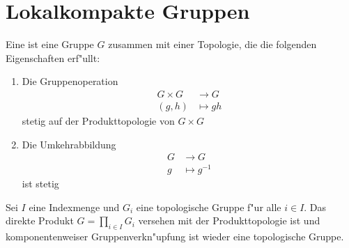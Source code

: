 \section{Lokalkompakte Gruppen}

\begin{defi}
	Eine  ist eine Gruppe $G$ zusammen mit einer Topologie, die die folgenden Eigenschaften erf"ullt:
		\begin{enumerate}[label=(\roman*), leftmargin=*, align=left, labelsep=1pt]
			\item Die Gruppenoperation
				\begin{align*}
					G \times G &\to G\\
					(g,h) &\mapsto gh
				\end{align*}
			stetig auf der Produkttopologie von $G \times G$
			\item Die Umkehrabbildung
				\begin{align*}
					G &\to G\\
					g &\mapsto g^{-1}
				\end{align*}
				ist stetig
		\end{enumerate}
	\end{defi}
	\begin{lemma}\label{lemma:direktesProduktTopologischerGruppen}
		Sei $I$ eine Indexmenge und $G_i$ eine topologische Gruppe f"ur alle $i \in I$. Das direkte Produkt $G = \prod_{i \in I} G_i$ versehen mit der Produkttopologie ist  und komponentenweiser Gruppenverkn"upfung ist wieder eine topologische Gruppe.
	\end{lemma}
